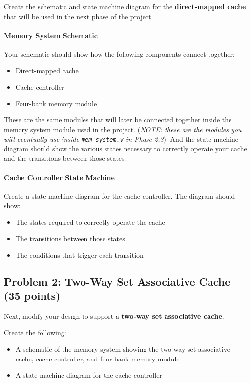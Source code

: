 \documentclass[12pt]{article}
\begin{document}
Create the schematic and state machine diagram for the \textbf{direct-mapped cache} that will be used in the next phase of the project.

\paragraph{Memory System Schematic}

Your schematic should show how the following components connect together:

\begin{itemize}
\item Direct-mapped cache
\item Cache controller
\item Four-bank memory module
\end{itemize}

These are the same modules that will later be connected together inside the memory system module used in the project.
(\textsl{NOTE: these are the modules you will
eventually use inside \texttt{mem\_system.v} in Phase 2.3}). And the state machine diagram should show the various
states necessary to correctly operate your cache and the transitions between those states.

\paragraph{Cache Controller State Machine}

Create a state machine diagram for the cache controller.
The diagram should show:

\begin{itemize}
\item The states required to correctly operate the cache
\item The transitions between those states
\item The conditions that trigger each transition
\end{itemize}

\subsection*{Problem 2: Two-Way Set Associative Cache (35 points)}

Next, modify your design to support a \textbf{two-way set associative cache}.

Create the following:

\begin{itemize}
\item A schematic of the memory system showing the two-way set associative cache, cache controller, and four-bank memory module
\item A state machine diagram for the cache controller
\end{itemize}
\end{document}
